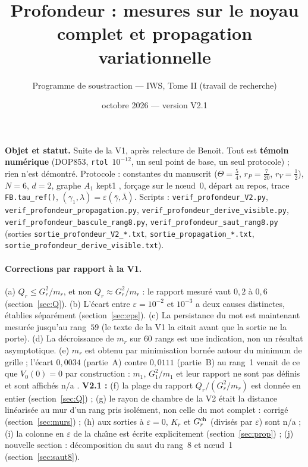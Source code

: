\documentclass[11pt,a4paper]{article}
\title{Profondeur : mesures sur le noyau complet et propagation variationnelle}
\author{Programme de soustraction --- IWS, Tome II (travail de recherche)}
\date{octobre 2026 --- version V2.1}
\theoremstyle{remark}
\begin{document}
\maketitle

\noindent\textbf{Objet et statut.} Suite de la V1, apr\`es relecture de Benoit. Tout est \textbf{t\'emoin num\'erique} (DOP853, \texttt{rtol}~$10^{-12}$, un seul point de base, un seul protocole) ; rien n'est d\'emontr\'e. Protocole : constantes du manuscrit ($\Theta=\frac54$, $r_P=\frac7{20}$, $r_V=\frac12$), $N=6$, $d=2$, graphe $A_1$ \og kept1 \fg, for\c{c}age sur le n\oe ud~0, d\'epart au repos, trace \texttt{FB.tau\_ref()}, $(\gamma_1,\lambda)=\varepsilon(\bar\gamma,\bar\lambda)$. Scripts : \texttt{verif\_profondeur\_V2.py}, \texttt{verif\_profondeur\_propagation.py}, \texttt{verif\_profondeur\_derive\_visible.py}, \texttt{verif\_profondeur\_bascule\_rang8.py}, \texttt{verif\_profondeur\_saut\_rang8.py} (sorties \texttt{sortie\_profondeur\_V2\_*.txt}, \texttt{sortie\_propagation\_*.txt}, \texttt{sortie\_profondeur\_derive\_visible.txt}).

\paragraph{Corrections par rapport \`a la V1.}
(a) $Q_r\le G_r^2/m_r$, et non $Q_r\approx G_r^2/m_r$ : le rapport mesur\'e vaut $0{,}2$ \`a $0{,}6$ (section~\ref{sec:Q}). (b) L'\'ecart entre $\varepsilon=10^{-2}$ et $10^{-3}$ a deux causes distinctes, \'etablies s\'epar\'ement (section~\ref{sec:eps}). (c) La persistance du mot est maintenant mesur\'ee jusqu'au rang~$59$ (le texte de la V1 la citait avant que la sortie ne la porte). (d) La d\'ecroissance de $m_r$ sur $60$ rangs est une indication, non un r\'esultat asymptotique. (e) $m_r$ est obtenu par minimisation born\'ee autour du minimum de grille ; l'\'ecart $0{,}0034$ (partie~A) contre $0{,}0111$ (partie~B) au rang~1 venait de ce que $V_0(0)=0$ par construction : $m_1$, $G_1^2/m_1$ et leur rapport ne sont pas d\'efinis et sont affich\'es \og n/a \fg. \textbf{V2.1 :} (f) la plage du rapport $Q_r/(G_r^2/m_r)$ est donn\'ee en entier (section~\ref{sec:Q}) ; (g) le \og rayon de chambre \fg{} de la V2 \'etait la distance lin\'earis\'ee au mur d'un rang pris isol\'ement, non celle du mot complet : corrig\'e (section~\ref{sec:murs}) ; (h) aux sorties \`a $\varepsilon=0$, $K_r$ et $G_r^{\rm ch}$ (divis\'es par $\varepsilon$) sont \og n/a \fg{} ; (i) la colonne en $\varepsilon$ de la cha\^{\i}ne est \'ecrite explicitement (section~\ref{sec:prop}) ; (j) nouvelle section : d\'ecomposition du saut du rang~8 et n\oe ud~1 (section~\ref{sec:saut8}).
\end{document}
